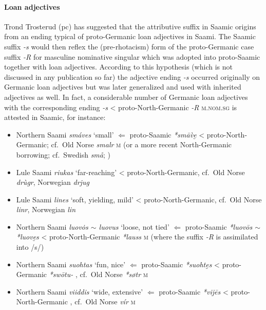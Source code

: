 {\paragraph{Loan adjectives} Trond Trosterud (pc) has suggested that the attributive suffix in Saamic origins from an ending typical of proto-Germanic loan adjectives in Saami. The Saamic suffix \textit{-s} would then reflex the (pre-rhotacism) form of the proto-Germanic case suffix \textit{-R} for masculine nominative singular which was adopted into proto-Saamic together with loan adjectives. According to this hypothesis (which is not discussed in any publication so far) the adjective ending \mbox{\textit{-s}} occurred originally on Germanic loan adjectives but was later generalized and used with inherited adjectives as well. In fact, a considerable number of Germanic loan adjectives with the corresponding ending \textit{-s} < proto-North-Germanic \textit{-R} \textsc{m.nom.sg} is attested in Saamic, for instance:
 
\begin{itemize}
\item Northern Saami \textit{smáves} ‘small’ $\Leftarrow$ proto-Saamic \textit{*smāv̀e̮} < proto-North-Germanic; cf.~Old Norse \textit{smalr} \textsc{m} (or a more recent North-Germanic borrowing; cf.~Swedish \textit{sm\aa}; \citealt[263]{sammallahti1998b})
\item Lule Saami \textit{riukas} ‘far-reaching’ < proto-North-Germanic, cf.~Old Norse \textit{drùgr}, Norwegian \textit{drjug} \cite[267]{qvigstad1893}
\item Lule Saami \textit{lines} ‘soft, yielding, mild’ < proto-North-Germanic, cf.~Old Norse \textit{linr}, Norwegian \textit{lin} \cite[218]{qvigstad1893}
\item Northern Saami \textit{luov\.{o}s $\sim$ luovus} ‘loose, not tied’ $\Leftarrow$ proto-Saamic \textit{*luovōs $\sim$ *luove̮s} < proto-North-Germanic \textit{*lauss} \textsc{m} (where the suffix \textit{-R} is assimilated into /s/) \cite[264]{sammallahti1998b}
\item Northern Saami \textit{suohtas} ‘fun, nice’ $\Leftarrow$ proto-Saamic \textit{*suohte̮s} < proto-Germanic \textit{*swōtu-} \cite[264]{sammallahti1998b}, cf.~Old Norse \textit{*søtr} \textsc{m} 
\item Northern Saami \textit{viiddis} ‘wide, extensive’ $\Leftarrow$ proto-Saamic \textit{*vij{\dh}ēs} < proto-North-Germanic \cite[148–149]{lehtiranta1989}, cf.~Old Norse \textit{v\'i{\dh}r} \textsc{m}
\end{itemize}

}
